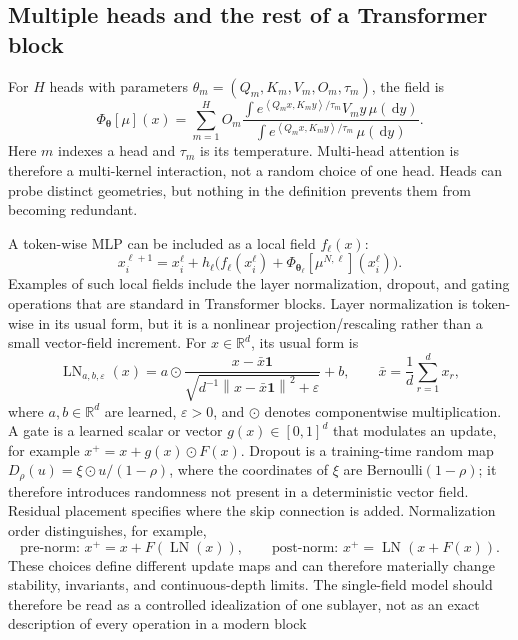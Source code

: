 \documentclass[11pt]{amsart}
\numberwithin{equation}{section}
\theoremstyle{plain}
\newcommand{\R}{\mathbb{R}}
\newcommand{\dd}{\,\mathrm{d}}
\newcommand{\norm}[1]{\left\lVert#1\right\rVert}
\newcommand{\ip}[2]{\left\langle#1,#2\right\rangle}
\begin{document}
\subsection{Multiple heads and the rest of a Transformer block}
For $H$ heads with parameters
$\theta_m=(Q_m,K_m,V_m,O_m,\tau_m)$, the field is
\begin{equation}\label{eq:multihead-field}
  \Phi_{\boldsymbol\theta}[\mu](x)
  =\sum_{m=1}^H O_m
   \frac{\int e^{\ip{Q_mx}{K_my}/\tau_m}V_my\,\mu(\dd y)}
        {\int e^{\ip{Q_mx}{K_my}/\tau_m}\,\mu(\dd y)}.
\end{equation}
Here $m$ indexes a head and $\tau_m$ is its temperature.  Multi-head attention
is therefore a multi-kernel interaction, not a random choice of one head.
Heads can probe distinct geometries, but nothing in the definition prevents
them from becoming redundant.

A token-wise MLP can be included as a local field $f_\ell(x)$:
\[
 x_i^{\ell+1}=x_i^\ell+h_\ell
 \bigl(f_\ell(x_i^\ell)+
       \Phi_{\boldsymbol\theta_\ell}[\mu^{N,\ell}](x_i^\ell)\bigr).
\]
Examples of such local fields include the layer normalization, dropout, and gating operations that are standard in Transformer blocks. Layer normalization is token-wise in its usual form, but it is a nonlinear projection/rescaling rather than a small vector-field increment.
For $x\in\R^d$, its usual form is
\[
 \operatorname{LN}_{a,b,\varepsilon}(x)
 =a\odot
 \frac{x-\bar x\mathbf 1}
 {\sqrt{d^{-1}\norm{x-\bar x\mathbf 1}^2+\varepsilon}}+b,
 \qquad
 \bar x=\frac1d\sum_{r=1}^d x_r,
\]
where $a,b\in\R^d$ are learned, $\varepsilon>0$, and $\odot$ denotes
componentwise multiplication.  A gate is a learned scalar or vector
$g(x)\in[0,1]^d$ that modulates an update, for example
$x^+=x+g(x)\odot F(x)$.  Dropout is a training-time random map
$D_\rho(u)=\xi\odot u/(1-\rho)$, where the coordinates of $\xi$ are
Bernoulli$(1-\rho)$; it therefore introduces randomness not present in a
deterministic vector field.  Residual placement specifies where the skip
connection is added.  Normalization order distinguishes, for example,
\[
 \text{pre-norm: }x^+=x+F(\operatorname{LN}(x)),
 \qquad
 \text{post-norm: }x^+=\operatorname{LN}(x+F(x)).
\]
These choices define different update maps and can therefore materially
change stability, invariants, and continuous-depth limits.
The single-field model should therefore be read as a controlled
idealization of one sublayer, not as an exact description of every operation in
a modern block
\end{document}
